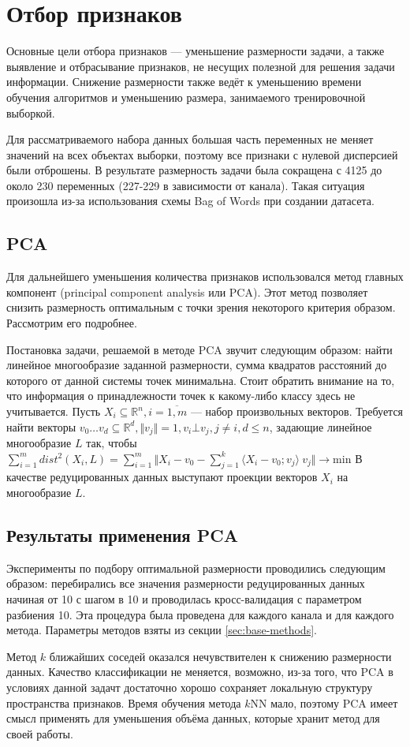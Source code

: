 \section{Отбор признаков}
Основные цели отбора признаков --- уменьшение размерности задачи, а также выявление и отбрасывание признаков, не несущих полезной для решения задачи информации. Снижение размерности также ведёт к уменьшению времени обучения алгоритмов и уменьшению размера, занимаемого тренировочной выборкой.
 \par
Для рассматриваемого набора данных большая часть переменных не меняет значений на всех объектах выборки, поэтому все признаки с нулевой дисперсией были отброшены. В результате размерность задачи была сокращена с 4125 до около 230 переменных (227-229 в зависимости от канала). Такая ситуация произошла из-за использования схемы Bag of Words при создании датасета.
\subsection{PCA}
Для дальнейшего уменьшения количества признаков использовался метод главных компонент (principal component analysis или PCA)\cite{pearson}. Этот метод позволяет снизить размерность оптимальным с точки зрения некоторого критерия образом. Рассмотрим его подробнее.
 \par
 Постановка задачи, решаемой в методе PCA звучит следующим образом: найти линейное многообразие заданной  размерности, сумма квадратов расстояний до которого от данной системы точек минимальна. Стоит обратить внимание на то, что информация о принадлежности точек к какому-либо классу здесь не учитывается. Пусть \( X_i \subseteq \mathbb{R}^n, i=\overline{1,m} \) --- набор произвольных векторов. Требуется найти векторы \(v_0\ldots v_d\subseteq \mathbb{R}^d, \Vert v_j \Vert = 1, v_i \bot v_j, j \neq  i, d \leq n\), задающие линейное многообразие \(L\) так, чтобы \( \sum_{i=1}^{m} dist^2(X_i, L) = \sum_{i=1}^{m}\Vert X_i - v_0 - \sum_{j=1}^k\langle X_i - v_0; v_j\rangle\ v_j \Vert\rightarrow \mathrm{min}\) В качестве редуцированных данных выступают проекции векторов \( X_i\) на многообразие \(L\). 
  
 \subsection*{Результаты применения PCA}
 Эксперименты по подбору оптимальной размерности проводились следующим образом: перебирались все значения 
 размерности редуцированных данных начиная от 10 с шагом в 10 и проводилась кросс-валидация с параметром разбиения 10. Эта процедура была проведена для каждого канала и для каждого метода. Параметры методов 
 взяты из секции \ref{sec:base-methods}.
\par
Метод \(k\) ближайших соседей оказался нечувствителен к снижению размерности данных. Качество классификации не меняется, возможно, из-за того, что PCA в условиях данной задачт достаточно хорошо сохраняет локальную структуру пространства признаков. Время обучения метода \(k\)NN мало, поэтому PCA
имеет смысл применять для уменьшения объёма данных, которые хранит метод для своей работы.

